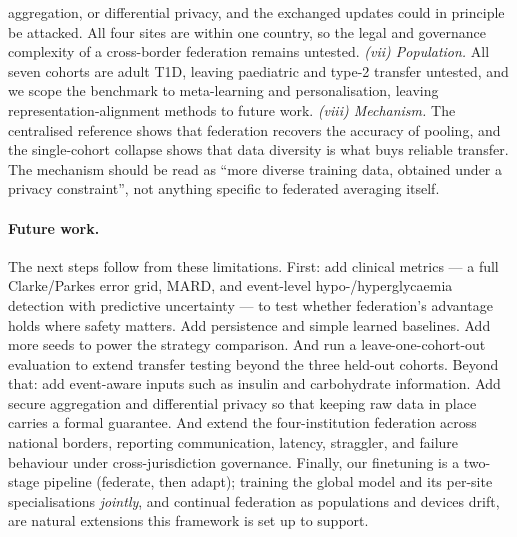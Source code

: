 \documentclass[10pt,letterpaper]{article}
\begin{document}
aggregation, or differential privacy, and the exchanged updates could in
principle be attacked. All four sites are within one country, so the legal and
governance complexity of a cross-border federation remains untested.
\emph{(vii) Population.} All seven cohorts are adult T1D, leaving paediatric
and type-2 transfer untested, and we scope the benchmark to meta-learning and
personalisation, leaving representation-alignment methods to future work.
\emph{(viii) Mechanism.} The centralised reference shows that federation
recovers the accuracy of pooling, and the single-cohort collapse shows that
data diversity is what buys reliable transfer. The mechanism should be read
as ``more diverse training data, obtained under a privacy constraint'', not
anything specific to federated averaging itself.

\paragraph{Future work.} The next steps follow from these limitations. First:
add clinical metrics --- a full Clarke/Parkes error grid, MARD, and
event-level hypo-/hyperglycaemia detection with predictive uncertainty --- to
test whether federation's advantage holds where safety matters. Add
persistence and simple learned baselines. Add more seeds to power the
strategy comparison. And run a leave-one-cohort-out evaluation to extend
transfer testing beyond the three held-out cohorts. Beyond that: add
event-aware inputs such as insulin and carbohydrate information. Add secure
aggregation and differential privacy so that keeping raw data in place
carries a formal guarantee. And extend the four-institution federation across
national borders, reporting communication, latency, straggler, and failure
behaviour under cross-jurisdiction governance. Finally, our finetuning is a
two-stage pipeline (federate, then adapt); training the global model and its
per-site specialisations \emph{jointly}, and continual federation as
populations and devices drift, are natural extensions this framework is set
up to support.



\end{document}
